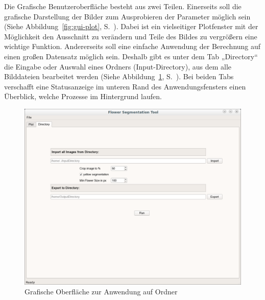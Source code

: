 Die Grafische Benutzeroberfläche besteht aus zwei Teilen. Einerseits soll die grafische Darstellung der Bilder zum Ausprobieren der Parameter möglich sein (Siehe Abbildung~\ref{fig:gui-plot}, S.~\pageref{fig:gui-plot}). Dabei ist ein vielseitiger Plotfenster mit der Möglichkeit den Ausschnitt zu verändern und Teile des Bildes zu vergrößern eine wichtige Funktion. Andererseits soll eine einfache Anwendung der Berechnung auf einen großen Datensatz möglich sein. Deshalb gibt es unter dem Tab „Directory“ die Eingabe oder Auswahl eines Ordners (Input-Directory), aus dem alle Bilddateien bearbeitet werden (Siehe Abbildung~\ref{fig:gui-dir}, S.~\pageref{fig:gui-dir}). Bei beiden Tabs verschafft eine Statusanzeige im unteren Rand des Anwendungsfensters einen Überblick, welche Prozesse im Hintergrund laufen.

\begin{figure}[htb]
 \centering
 \includegraphics[width=\textwidth,angle=0]{abb/gui/directory-fenster}
 \caption{Grafische Oberfläche zur Anwendung auf Ordner}
\label{fig:gui-dir}
\end{figure}

